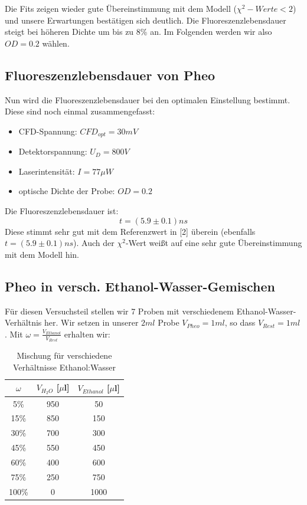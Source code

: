 \documentclass{article}
\begin{document}
Die Fits zeigen wieder gute Übereinstimmung mit dem Modell ($\chi^2-Werte <2$) und unsere Erwartungen bestätigen sich deutlich.
Die Fluoreszenzlebensdauer steigt bei höheren Dichte um bis zu 8\% an. Im Folgenden werden wir also $OD = 0.2$ wählen.




\subsection{Fluoreszenzlebensdauer von Pheo}
Nun wird die Fluoreszenzlebensdauer bei den optimalen Einstellung bestimmt. Diese sind noch einmal zusammengefasst:

\begin{itemize}
  \item CFD-Spannung: $CFD_{opt}=30mV$
  \item Detektorspannung: $U_D=800V$
  \item Laserintensität: $I=77\mu W$
  \item optische Dichte der Probe: $OD=0.2$
\end{itemize}

Die Fluoreszenzlebensdauer ist: $$t=(5.9 \pm 0.1)ns$$
Diese stimmt sehr gut mit dem Referenzwert in [2] überein (ebenfalls $t=(5.9 \pm 0.1)ns$). Auch der $\chi^2$-Wert weißt auf
eine sehr gute Übereinstimmung mit dem Modell hin.



\subsection{Pheo in versch. Ethanol-Wasser-Gemischen}
Für diesen Versuchsteil stellen wir 7 Proben mit verschiedenem Ethanol-Wasser-Verhältnis her.
Wir setzen in unserer $2ml$ Probe $V_{Pheo}=1ml$, so dass $V_{Rest}=1ml$. Mit $\omega= \frac{V_{Ethanol}}{V_{Rest}}$ erhalten wir:

\begin{table}[h]
  \centering
  \begin{tabular}{c|c|c}
    $\omega$ & $V_{H_2O}$ [$\mu$l] & $V_{Ethanol}$ [$\mu$l] \\
    \hline
     5\%     & 950                 & 50                     \\
     15\%    & 850                 & 150                    \\
     30\%    & 700                 & 300                    \\
     45\%    & 550                 & 450                    \\
     60\%    & 400                 & 600                    \\
     75\%    & 250                 & 750                    \\
     100\%   & 0                   & 1000                   \\

  \end{tabular}
  \caption{Mischung für verschiedene Verhältnisse Ethanol:Wasser}
\end{table}
\end{document}
